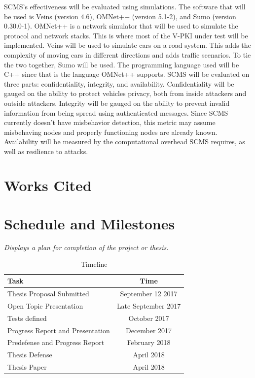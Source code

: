 \documentclass {article}
\newcommand{\sechint}[1]{\small{\emph{#1}} \bigskip}
\begin{document}
SCMS's effectiveness will be evaluated using simulations. The software that will be used is Veins (version 4.6), OMNet++ (version 5.1-2), and Sumo (version 0.30.0-1). OMNet++ is a network simulator that will be used to simulate the protocol and network stacks. This is where most of the V-PKI under test will be implemented. Veins will be used to simulate cars on a road system. This adds the complexity of moving cars in different directions and adds traffic scenarios. To tie the two together, Sumo will be used.
The programming language used will be C++ since that is the language OMNet++ supports. SCMS will be evaluated on three parts: confidentiality, integrity, and availability. Confidentiality will be gauged on the ability to protect vehicles privacy, both from inside attackers and outside attackers. Integrity will be gauged on the ability to prevent invalid information from being spread using authenticated messages. Since SCMS currently doesn't have misbehavior detection, this metric may assume misbehaving nodes and properly functioning nodes are already known. Availability will be measured by the computational overhead SCMS requires, as well as resilience to attacks.

\pagebreak
\section{Works Cited}
\printbibliography

\pagebreak
\section{Schedule and Milestones}{\sechint{Displays a plan for completion of the project or thesis.}}

\begin{table}[!ht]
	\centering
	\begin{tabular}{l|c}
		Task & Time \\ \hline \hline
		Thesis Proposal Submitted & September 12 2017 \\ \hline
		Open Topic Presentation & Late September 2017 \\ \hline
		Tests defined & October 2017 \\ \hline
		Progress Report and Presentation & December 2017 \\ \hline
		Predefense and Progress Report & February 2018 \\ \hline
		Thesis Defense & April 2018 \\ \hline
		Thesis Paper & April 2018 \\ \hline
	\end{tabular}
	\caption{Timeline}
\end{table}
\end{document}
